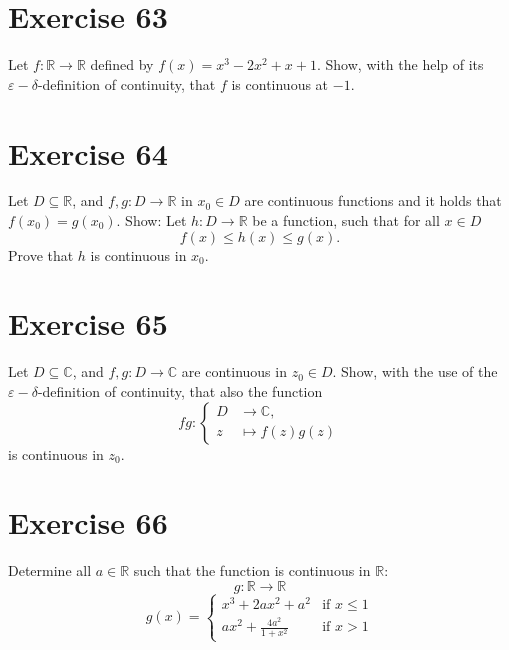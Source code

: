 \documentclass[a4paper]{article}
\theoremstyle{definition}
\begin{document}
\section{Exercise 63}
\begin{ex}
  Let $f: \mathbb R \rightarrow \mathbb R$ defined by $f(x) = x^3 - 2x^2 + x + 1$.
  Show, with the help of its $\varepsilon-\delta$-definition of continuity,
  that $f$ is continuous at $-1$.
\end{ex}

\section{Exercise 64}
\begin{ex}
  Let $D \subseteq \mathbb R$, and $f, g: D \rightarrow \mathbb R$ in $x_0 \in D$
  are continuous functions and it holds that $f(x_0) = g(x_0)$.
  Show: Let $h: D \rightarrow \mathbb R$ be a function, such that for all $x \in D$
  \[ f(x) \leq h(x) \leq g(x). \]
  Prove that $h$ is continuous in $x_0$.
\end{ex}

\section{Exercise 65}
\begin{ex}
  Let $D \subseteq \mathbb C$, and $f, g: D \rightarrow \mathbb C$ are continuous in $z_0 \in D$.
  Show, with the use of the $\varepsilon-\delta$-definition of continuity, that also the function
  \[
    fg : \begin{cases}
      D &\rightarrow \mathbb C, \\
      z &\mapsto f(z) g(z)
    \end{cases}
  \]
  is continuous in $z_0$.
\end{ex}

\section{Exercise 66}
\begin{ex}
  Determine all $a \in \mathbb R$ such that the function is continuous in $\mathbb R$:
  \[ g: \mathbb R \to \mathbb R \]
  \[
    g(x) = \begin{cases}
      x^3 + 2ax^2 + a^2 & \text{if } x \leq 1 \\
      ax^2 + \frac{4a^2}{1 + x^2} & \text{if } x > 1
    \end{cases}
  \]
\end{ex}
\end{document}
